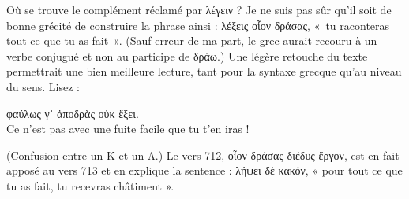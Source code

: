 \documentclass[12pt]{book}%
\newcommand{\citComm}[1]{\begin{quoting}[vskip=0pt] #1 \end{quoting}}%
\newcommand{\francais}[1]{{\policeFr #1}}%
\newcommand{\marqueur}[1]{\textsuperscript{#1}}%
\newenvironment{groupe}{%
\pstart%
\ledgroup%
}{%
\pend %
}%
\begin{document}
\begin{pages}
\begin{Leftside}
\begin{groupe}
{{%
%
%
%
%
%
%
%
%
%
%
%
Où se trouve le complément réclamé par λέγειν ? Je ne suis pas sûr qu'il soit de bonne grécité de construire la phrase ainsi %
: λέξεις οἷον δράσας, «~tu raconteras tout ce que tu as fait~». (Sauf erreur de ma part, le grec aurait recouru à un verbe conjugué et non au participe de δράω.)
Une légère retouche du texte permettrait une bien meilleure lecture, tant pour la syntaxe grecque qu'au niveau du sens.
Lisez : 
\citComm{φαύλως γ᾽ ἀποδρὰς οὐκ ἔξει.\\
\francais{Ce n'est pas avec une fuite facile que tu t'en iras !}}
(Confusion entre un Κ et un Λ.)
Le vers 712, οἷον δράσας διέδυς ἔργον, est en fait apposé au vers 713 et en explique la sentence : λήψει δὲ κακόν, « pour tout ce que tu as fait, tu recevras châtiment ».
}}
\end{groupe}
\end{Leftside}
\end{pages}
\end{document}
